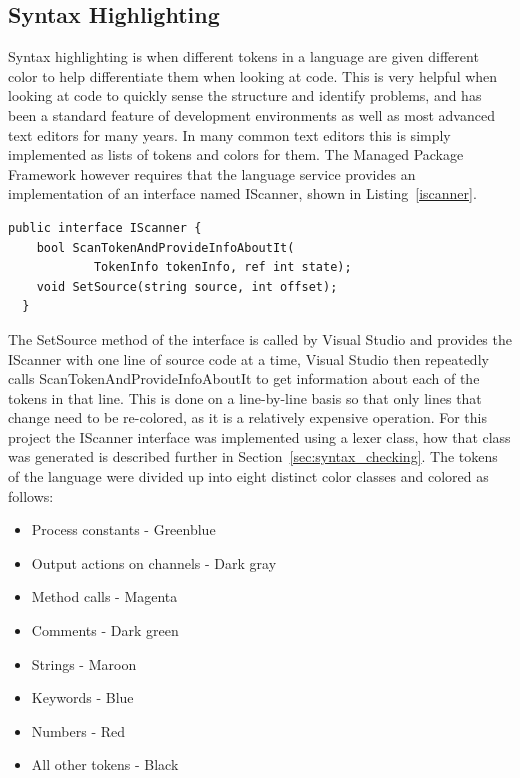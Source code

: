 	\subsection{Syntax Highlighting}
	Syntax highlighting is when different tokens in a language are given 
	different color to help differentiate them when looking at code. This
	is very helpful when looking at code to quickly sense the structure and
	identify problems, and has been a standard feature of development 
	environments as well as most advanced text editors for many years. In many
	common text editors this is simply implemented as lists of tokens and 
	colors for them. The Managed Package Framework however requires that the 
	language service provides an implementation of an interface named 
	\textsf{IScanner}, shown in Listing~\ref{iscanner}. 

	\begin{lstlisting}[caption=IScanner interface,label=iscanner]
  public interface IScanner {
    bool ScanTokenAndProvideInfoAboutIt(
    		TokenInfo tokenInfo, ref int state);
    void SetSource(string source, int offset);
  }	
\end{lstlisting}

	The \textsf{SetSource} method of the interface is called by Visual Studio 
	and provides the \textsf{IScanner} with one line of source code at a time, 
	Visual Studio then repeatedly calls \textsf{ScanTokenAndProvideInfoAboutIt} 
	to get information about each of the tokens in that line. This is done on a 
	line-by-line basis so that only lines that change need to be re-colored, as 
	it is a relatively expensive operation. For this project the 
	\textsf{IScanner} interface was implemented using a lexer class, how that 
	class was generated is described further in 
	Section~\ref{sec:syntax_checking}. The tokens of the language were divided 
	up into eight distinct color classes and colored as follows:
	
	\begin{itemize}
		\item Process constants - Greenblue
		\item Output actions on channels	- Dark gray
		\item Method calls - Magenta
		\item Comments - Dark green
		\item Strings - Maroon
		\item Keywords - Blue
		\item Numbers - Red
		\item All other tokens - Black
	\end{itemize}

